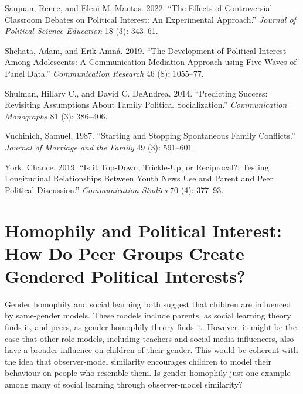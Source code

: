 \documentclass[
  letterpaper,
  DIV=11,
  numbers=noendperiod]{scrreprt}
\newlength{\cslhangindent}
\newlength{\cslentryspacingunit} %
\newenvironment{CSLReferences}[2] %
 {%
  \setlength{\parindent}{0pt}
  \ifodd #1
  \let\oldpar\par
  \def\par{\hangindent=\cslhangindent\oldpar}
  \fi
  \setlength{\parskip}{#2\cslentryspacingunit}
 }%
 {}
\begin{document}
\begin{CSLReferences}{1}{0}
\leavevmode{}%
Sanjuan, Renee, and Eleni M. Mantas. 2022. {``{The Effects of
Controversial Classroom Debates on Political Interest: An Experimental
Approach}.''} \emph{Journal of Political Science Education} 18 (3):
343--61.

\leavevmode{}%
Shehata, Adam, and Erik Amnå. 2019. {``{The Development of Political
Interest Among Adolescents: A Communication Mediation Approach using
Five Waves of Panel Data}.''} \emph{Communication Research} 46 (8):
1055--77.

\leavevmode{}%
Shulman, Hillary C., and David C. DeAndrea. 2014. {``{Predicting
Success: Revisiting Assumptions About Family Political
Socialization}.''} \emph{Communication Monographs} 81 (3): 386--406.

\leavevmode{}%
Vuchinich, Samuel. 1987. {``{Starting and Stopping Spontaneous Family
Conflicts}.''} \emph{Journal of Marriage and the Family} 49 (3):
591--601.

\leavevmode{}%
York, Chance. 2019. {``{Is it Top-Down, Trickle-Up, or Reciprocal?:
Testing Longitudinal Relationships Between Youth News Use and Parent and
Peer Political Discussion}.''} \emph{Communication Studies} 70 (4):
377--93.

\end{CSLReferences}


\hypertarget{sec-chap5}{%
\chapter{Homophily and Political Interest: How Do Peer Groups Create
Gendered Political Interests?}\label{sec-chap5}}

Gender homophily and social learning both suggest that children are
influenced by same-gender models. These models include parents, as
social learning theory finds it, and peers, as gender homophily theory
finds it. However, it might be the case that other role models,
including teachers and social media influencers, also have a broader
influence on children of their gender. This would be coherent with the
idea that observer-model similarity encourages children to model their
behaviour on people who resemble them. Is gender homophily just one
example among many of social learning through observer-model similarity?
\end{document}
